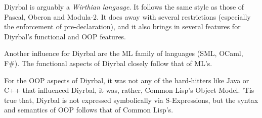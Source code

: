 \documentclass[a4paper,12pt]{article}
\newcommand{\nm}{Diyrbal\xspace}
\begin{document}
\nm is arguably a \textit{Wirthian language}. It follows the same style as those of Pascal, Oberon and Modula-2. It does away with several restrictions (especially the enforcement of pre-declaration), and it also brings in several features for \nm's functional and OOP features.

Another influence for \nm are the ML family of languages (SML, OCaml, F#). The functional aspects of \nm closely follow that of ML's.

For the OOP aspects of \nm, it was not any of the hard-hitters like Java or C++ that influenced \nm, it was, rather, Common Lisp's Object Model. 'Tis true that, \nm is not expressed symbolically via S-Expressions, but the syntax and semantics of OOP follows that of Common Lisp's.
\end{document}
